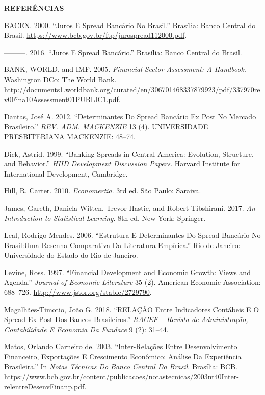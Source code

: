 \documentclass[ignorenonframetext,aspectratio=169,ignorenonframetext]{beamer}
\begin{document}
\begin{frame}{\textbf{REFERÊNCIAS}}
\protect\hypertarget{referuxeancias-3}{}

\hypertarget{refs}{}
\leavevmode\hypertarget{ref-BCB:2000}{}%
BACEN. 2000. ``Juros E Spread Bancário No Brasil.'' Brasília: Banco
Central do Brasil.
\url{https://www.bcb.gov.br/ftp/jurospread112000.pdf}.

\leavevmode\hypertarget{ref-BCB:2016}{}%
---------. 2016. ``Juros E Spread Bancário.'' Brasília: Banco Central do
Brasil.

\leavevmode\hypertarget{ref-WB:2005}{}%
BANK, WORLD, and IMF. 2005. \emph{Financial Sector Assessment: A
Handbook}. Washington DCo: The World Bank.
\url{http://documents1.worldbank.org/curated/en/306701468337879923/pdf/337970rev0Fina10Assessment01PUBLIC1.pdf}.

\leavevmode\hypertarget{ref-dantas:2012}{}%
Dantas, José A. 2012. ``Determinantes Do Spread Bancário Ex Post No
Mercado Brasileiro.'' \emph{REV. ADM. MACKENZIE} 13 (4). UNIVERSIDADE
PRESBITERIANA MACKENZIE: 48--74.

\leavevmode\hypertarget{ref-dick:1999}{}%
Dick, Astrid. 1999. ``Banking Spreads in Central America: Evolution,
Structure, and Behavior.'' \emph{HIID Development Discussion Papers}.
Harvard Institute for International Development, Cambridge.

\leavevmode\hypertarget{ref-hill:2010}{}%
Hill, R. Carter. 2010. \emph{Economertia}. 3rd ed. São Paulo: Saraiva.

\leavevmode\hypertarget{ref-gareth:2017}{}%
James, Gareth, Daniela Witten, Trevor Hastie, and Robert Tibshirani.
2017. \emph{An Introduction to Statistical Learning}. 8th ed. New York:
Springer.

\leavevmode\hypertarget{ref-leal:2006}{}%
Leal, Rodrigo Mendes. 2006. ``Estrutura E Determinantes Do Spread
Bancário No Brasil:Uma Resenha Comparativa Da Literatura Empírica.'' Rio
de Janeiro: Universidade do Estado do Rio de Janeiro.

\leavevmode\hypertarget{ref-levine:1997}{}%
Levine, Ross. 1997. ``Financial Development and Economic Growth: Views
and Agenda.'' \emph{Journal of Economic Literature} 35 (2). American
Economic Association: 688--726.
\url{http://www.jstor.org/stable/2729790}.

\leavevmode\hypertarget{ref-timotio:2018}{}%
Magalhães-Timotio, João G. 2018. ``RELAÇÃO Entre Indicadores Contábeis E
O Spread Ex-Post Dos Bancos Brasileiros.'' \emph{RACEF -- Revista de
Administração, Contabilidade E Economia Da Fundace} 9 (2): 31--44.

\leavevmode\hypertarget{ref-matos:2003}{}%
Matos, Orlando Carneiro de. 2003. ``Inter-Relações Entre Desenvolvimento
Financeiro, Exportações E Crescimento Econômico: Análise Da Experiência
Brasileira.'' In \emph{Notas Técnicas Do Banco Central Do Brasil}.
Brasília: BCB.
\url{https://www.bcb.gov.br/content/publicacoes/notastecnicas/2003nt40Inter-relentreDesenvFinanp.pdf}.

\end{frame}
\end{document}
